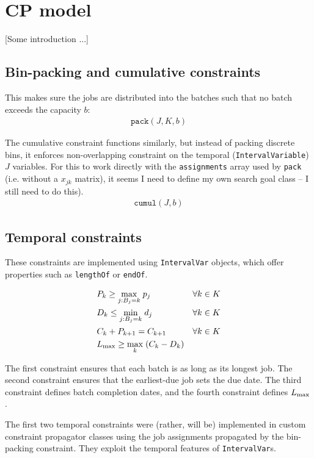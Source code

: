 \section{CP model}

[Some introduction ...]

\subsection{Bin-packing and cumulative constraints}
This makes sure the jobs are distributed into the batches such that no batch
exceeds the capacity $b$:
\begin{align}
\mathtt{pack}(J, K, b)
\end{align}

The cumulative constraint functions similarly, but instead of packing
discrete bins, it enforces non-overlapping constraint on the temporal
(\texttt{IntervalVariable}) $J$ variables. {\color{darkred} For this to work
directly with the \texttt{assignments} array used by \texttt{pack} (i.e. without
a $x_{jk}$ matrix), it seems I need to define my own search goal class -- I
still need to do this).}
\begin{align}
\mathtt{cumul}(J, b)
\end{align}

\subsection{Temporal constraints}
These constraints are implemented using \texttt{IntervalVar} objects, which
offer properties such as \texttt{lengthOf} or \texttt{endOf}.

\begin{alignat}{2}
& P_k \geq \underset{j : B_j = k}{\max} \; p_j \quad &&
\forall k \in K \\
& D_k \leq \underset{j : B_j = k}{\min}\; d_j \quad && \forall k \in K \\
& C_k + P_{k+1} = C_{k+1} \quad && \forall k \in K \\
& L_{\text{max}} \geq \underset{k}{\max} \;(C_k - D_k) && 
\end{alignat}

The first constraint ensures that each batch is as long as its longest job. 
The second constraint ensures that the earliest-due job sets the due date.
The third constraint defines batch completion dates, and the fourth constraint defines $L_{\text{max}}$.

The first two temporal constraints were {\color{darkred}(rather, will be)}
implemented in custom constraint propagator classes using the job assignments
propagated by the bin-packing constraint. They exploit the temporal features of
\texttt{IntervalVar}s.

